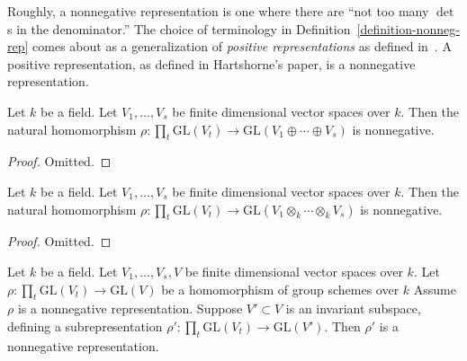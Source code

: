 Roughly, a nonnegative representation is one where there are ``not too many
$\det$s in the denominator.''
The choice of terminology in Definition~\ref{definition-nonneg-rep} comes about
as a generalization of \emph{positive representations} as defined
in~\cite[p.76]{hartshorne_ample_vb}.
A positive representation, as defined in Hartshorne's paper, is a nonnegative
representation.

\begin{lemma}
\label{lemma-sums-nonneg-rep}
Let $k$ be a field.
Let $V_1,\ldots,V_s$ be finite dimensional vector spaces over $k$.
Then the natural homomorphism
$\rho : \prod_t \mathrm{GL}(V_t) \to \mathrm{GL}(V_1 \oplus \cdots \oplus V_s)$
is nonnegative.
\end{lemma}

\begin{proof}
Omitted.
\end{proof}

\begin{lemma}
\label{lemma-tensor-nonneg-rep}
Let $k$ be a field.
Let $V_1,\ldots,V_s$ be finite dimensional vector spaces over $k$.
Then the natural homomorphism
$\rho : \prod_t \mathrm{GL}(V_t) \to \mathrm{GL}(V_1 \otimes_k \cdots \otimes_k V_s)$
is nonnegative.
\end{lemma}

\begin{proof}
Omitted.
\end{proof}

\begin{lemma}
\label{lemma-subreps-nonneg-rep}
Let $k$ be a field.
Let $V_1,\ldots,V_s,V$ be finite dimensional vector spaces over $k$.
Let $\rho : \prod_t \mathrm{GL}(V_t) \to \mathrm{GL}(V)$ be a homomorphism of
group schemes over $k$
Assume $\rho$ is a nonnegative representation.
Suppose $V' \subset V$ is an invariant subspace, defining a subrepresentation
$\rho' : \prod_t \mathrm{GL}(V_t) \to \mathrm{GL}(V')$.
Then $\rho'$ is a nonnegative representation.
\end{lemma}

